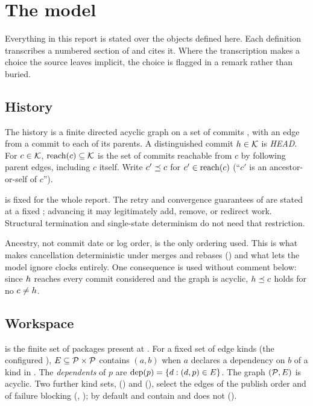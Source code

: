 \section{The model}
\label{sec:model}

Everything in this report is stated over the objects defined here. Each
definition transcribes a numbered section of \SPEC{} and cites it. Where
the transcription makes a choice the source leaves implicit, the choice is
flagged in a remark rather than buried.

\subsection{History}

\begin{definition}
\label{def:history}
The history is a finite directed acyclic graph on a set of commits \Cmts, with
an edge from a commit to each of its parents. A distinguished commit
$h \in \mathcal{K}$ is \emph{HEAD}. For $c \in \mathcal{K}$,
$\mathrm{reach}(c) \subseteq \mathcal{K}$ is the set of commits reachable from $c$ by following
parent edges, including $c$ itself. Write $c' \preceq c$ for $c' \in \mathrm{reach}(c)$
(``$c'$ is an ancestor-or-self of $c$'').
\end{definition}

\Head{} is fixed for the whole report. The retry and convergence guarantees of  are stated at a fixed \Head{}; advancing it may legitimately add, remove, or redirect work. Structural termination and single-state determinism do not need that restriction.

\begin{remark}
Ancestry, not commit date or log order, is the only ordering used. This is what
makes cancellation deterministic under merges and rebases () and
what lets the model ignore clocks entirely. One consequence is used without
comment below: since $h$ reaches every commit considered and the graph is
acyclic, $h \preceq c$ holds for no $c \neq h$.
\end{remark}

\subsection{Workspace}

\begin{definition}
\label{def:graph}
\Pkgs{} is the finite set of packages present at \Head{}. For a fixed set of
edge kinds \Kprop{} (the configured ), $E \subseteq
\mathcal{P} \times \mathcal{P}$ contains $(a,b)$ when $a$ declares a dependency on $b$ of a
kind in \Kprop{}. The \emph{dependents} of $p$ are $\mathrm{dep}(p) = \{d : (d,p) \in
E\}$. The graph $(\mathcal{P}, E)$ is acyclic. Two further kind sets,
\Korder{} () and \Kblock{}
(), select the edges of the publish order and of
failure blocking (, ); by default \Kprop{} and \Korder{}
contain  and \Kblock{} does not ().
\end{definition}

